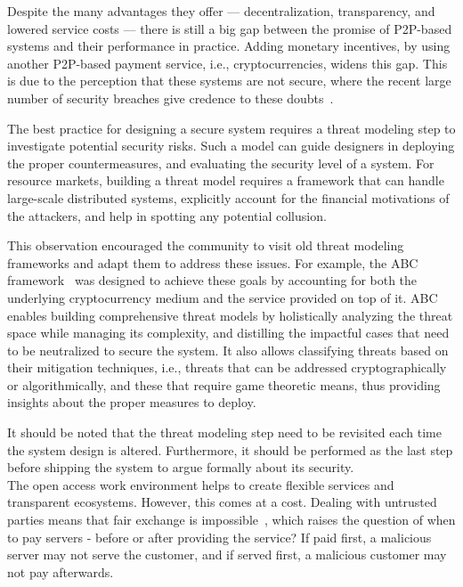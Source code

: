 \documentclass{llncs}
\begin{document}
 Despite the many advantages they offer — decentralization, transparency, and lowered service costs — there is still a big gap between the promise of P2P-based systems and their performance in practice. Adding monetary incentives, by using another P2P-based payment service, i.e., cryptocurrencies, widens this gap. This is due to the perception that these systems are not secure, where the recent large number of security breaches give credence to these doubts~\cite{benebit-scam,binance-hack,bitcoin-cash-hack,bitcoingold-double-spending,exchange-hack-b,bitfloor-hack,korea-exchange-hack,eth-hack,ico-hack-b,exchange-hack,enigma-hack,mine-hack}.


The best practice for designing a secure system requires a threat modeling step to investigate potential security risks. Such a model can guide designers in deploying the proper countermeasures, and evaluating the security level of a system. For resource markets, building a threat model requires a framework that can handle large-scale distributed systems, explicitly account for the financial motivations of the attackers, and help in spotting any potential collusion. 


This observation encouraged the community to visit old threat modeling frameworks and adapt them to address these issues. For example, the ABC framework~\cite{Almashaqbeh19} was designed to achieve these goals by accounting for both the underlying cryptocurrency medium and the service provided on top of it. ABC enables building comprehensive threat models by holistically analyzing the threat space while managing its complexity, and distilling the impactful cases that need to be neutralized to secure the system. It also allows classifying threats based on their mitigation techniques, i.e., threats that can be addressed cryptographically or algorithmically, and these that require game theoretic means, thus providing insights about the proper measures to deploy.


It should be noted that the threat modeling step need to be revisited each time the system design is altered. Furthermore, it should be performed as the last step before shipping the system to argue formally about its security.  \\


 The open access work environment helps to create flexible services and transparent ecosystems. However, this comes at a cost. Dealing with untrusted parties means that fair exchange is impossible~\cite{Even80,Pagnia99}, which raises the question of when to pay servers - before or after providing the service? If paid first, a malicious server may not serve the customer, and if served first, a malicious customer may not pay afterwards.
 
\end{document}

